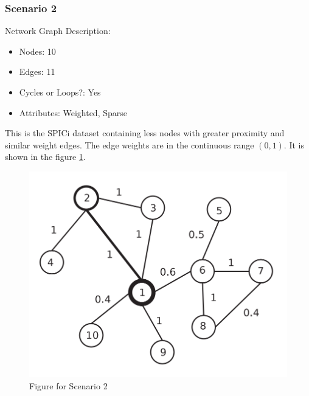 \documentclass[10pt]{extarticle}
\begin{document}
	\subsubsection{Scenario 2}
	Network Graph Description:
	\begin{itemize}
		\item Nodes: 10
		\item Edges: 11
		\item Cycles or Loops?: Yes
		\item Attributes: Weighted, Sparse
	\end{itemize}
	This is the SPICi dataset containing less nodes with greater proximity and similar weight edges. The edge weights are in the continuous range $(0,1)$. It is shown in the figure \ref{fig:spici}.
	\begin{figure}
		\includegraphics[width=\linewidth]{Spici.png}
		\caption{Figure for Scenario 2}
		\label{fig:spici}
	\end{figure}
\end{document}
